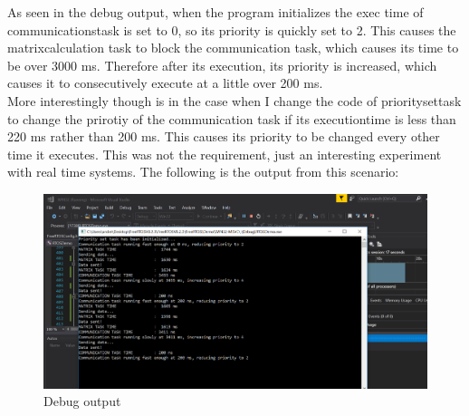 \documentclass[12pt,fleqn,leqno,letterpaper]{article}
\begin{document}
        As seen in the debug output, when the program initializes the exec time of communicationstask is set to 0, 
        so its priority is quickly set to 2.  This causes the matrixcalculation task to block the communication task, which causes 
        its time to be over 3000 ms.  Therefore after its execution, its priority is increased, which causes it to 
        consecutively execute at a little over 200 ms. \\
        
        More interestingly though is in the case when I change the code of prioritysettask to change the prirotiy of 
        the communication task if its executiontime is less than 220 ms rather than 200 ms.  This causes its priority 
        to be changed every other time it executes.  This was not the requirement, just an interesting experiment with 
        real time systems.  The following is the output from this scenario:
        
        \begin{figure}[h]
            \centering
            \includegraphics[width=\textwidth]{Debug_2.png}
            \caption{Debug output}
            \label{figure:debug2}
        \end{figure}
    
\end{document}
